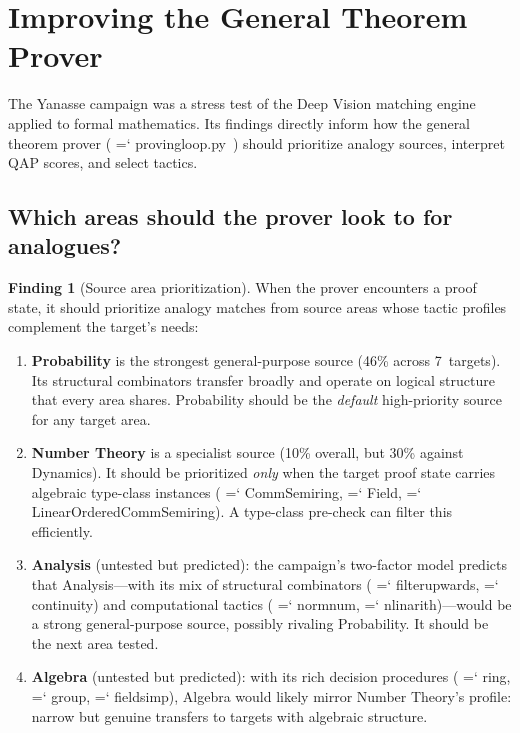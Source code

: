 \documentclass[11pt]{article}
\renewcommand{\texttt}[1]{%
  \begingroup\ttfamily\hyphenchar\font=`\-\relax
  \def\_{\textunderscore\discretionary{}{}{}}%
  #1\endgroup}
\theoremstyle{definition}
\newtheorem{finding}[theorem]{Finding}
\theoremstyle{remark}
\begin{document}
\section{Improving the General Theorem Prover}\label{sec:prover}

The Yanasse campaign was a stress test of the Deep Vision matching
engine applied to formal mathematics.  Its findings directly
inform how the general theorem prover
(\texttt{proving\_loop.py}~\cite{linhares_deep_vision}) should
prioritize analogy sources, interpret QAP scores, and select tactics.

\subsection{Which areas should the prover look to for analogues?}

\begin{finding}[Source area prioritization]%
\label{find:source_priority}
When the prover encounters a proof state, it should prioritize
analogy matches from source areas whose tactic profiles complement
the target's needs:
\begin{enumerate}
\item \textbf{Probability} is the strongest general-purpose source
  (46\% across 7~targets).  Its structural combinators transfer
  broadly and operate on logical structure that every area shares.
  Probability should be the \emph{default} high-priority source
  for any target area.

\item \textbf{Number Theory} is a specialist source (10\% overall,
  but 30\% against Dynamics).  It should be prioritized \emph{only}
  when the target proof state carries algebraic type-class instances
  (\texttt{CommSemiring}, \texttt{Field},
  \texttt{LinearOrderedCommSemiring}).  A type-class pre-check can
  filter this efficiently.

\item \textbf{Analysis} (untested but predicted): the campaign's
  two-factor model predicts that Analysis---with its mix of
  structural combinators (\texttt{filter\_upwards},
  \texttt{continuity}) and computational tactics
  (\texttt{norm\_num}, \texttt{nlinarith})---would be a strong
  general-purpose source, possibly rivaling Probability.  It
  should be the next area tested.

\item \textbf{Algebra} (untested but predicted): with its rich
  decision procedures (\texttt{ring}, \texttt{group},
  \texttt{field\_simp}), Algebra would likely mirror Number
  Theory's profile: narrow but genuine transfers to targets with
  algebraic structure.
\end{enumerate}
\end{finding}
\end{document}
